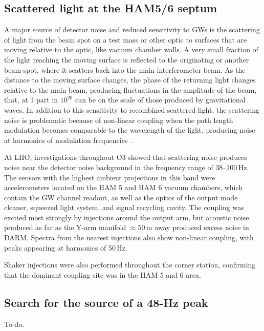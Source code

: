 \subsection{Scattered light at the HAM5/6 septum}\label{sec:noise-vib-scatter}

A major source of detector noise and reduced sensitivity to \acp{GW} is the scattering of light from the beam spot on a test mass or other optic to surfaces that are moving relative to the optic, like vacuum chamber walls.
A very small fraction of the light reaching the moving surface is reflected to the originating or another beam spot, where it scatters back into the main interferometer beam.
As the distance to the moving surface changes, the phase of the returning light changes relative to the main beam, producing fluctuations in the amplitude of the beam, that, at 1 part in $10^{20}$ can be on the scale of those produced by gravitational waves.
In addition to this sensitivity to recombined scattered light, the scattering noise is problematic because of non-linear coupling when the path length modulation becomes comparable to the wavelength of the light, producing noise at harmonics of modulation frequencies~\citep{Soni_2020}.

At \ac{LHO}, investigations throughout \ac{O3} showed that scattering noise produces noise near the detector noise background in the frequency range of 38--100\,Hz.
The sensors with the highest ambient projections in this band were accelerometers located on the HAM 5 and HAM 6 vacuum chambers, which contain the \ac{GW} channel readout, as well as the optics of the output mode cleaner, squeezed light system, and signal recycling cavity.
The coupling was excited most strongly by injections around the output arm, but acoustic noise produced as far as the Y-arm manifold $\approx 50$\,m away produced excess noise in \ac{DARM}.
Spectra from the nearest injections also show non-linear coupling, with peaks appearing at harmonics of 50\,Hz.

Shaker injections were also performed throughout the corner station, confirming that the dominant coupling site was in the HAM 5 and 6 area.



\subsection{Search for the source of a 48-Hz peak}\label{sec:noise-vib-48hz}

{\color{red}
To-do.}

